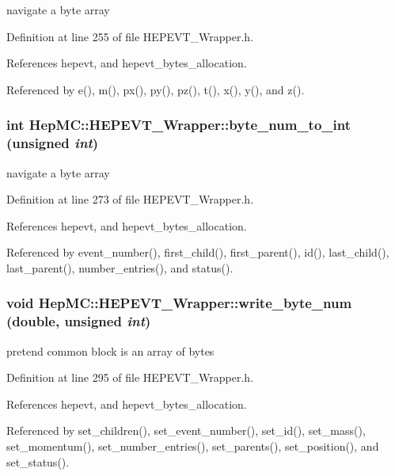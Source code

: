 navigate a byte array 



Definition at line 255 of file HEPEVT\_\-Wrapper.h.

References hepevt, and hepevt\_\-bytes\_\-allocation.

Referenced by e(), m(), px(), py(), pz(), t(), x(), y(), and z().
\subsubsection{\setlength{\rightskip}{0pt plus 5cm}int Hep\-MC::HEPEVT\_\-Wrapper::byte\_\-num\_\-to\_\-int (unsigned {\em int})\hspace{0.3cm}{\tt  [inline, static, protected]}}\label{classHepMC_1_1HEPEVT__Wrapper_a823644bba3e2e3adb4a4b898cc0d811}


navigate a byte array 



Definition at line 273 of file HEPEVT\_\-Wrapper.h.

References hepevt, and hepevt\_\-bytes\_\-allocation.

Referenced by event\_\-number(), first\_\-child(), first\_\-parent(), id(), last\_\-child(), last\_\-parent(), number\_\-entries(), and status().
\subsubsection{\setlength{\rightskip}{0pt plus 5cm}void Hep\-MC::HEPEVT\_\-Wrapper::write\_\-byte\_\-num (double, unsigned {\em int})\hspace{0.3cm}{\tt  [inline, static, protected]}}\label{classHepMC_1_1HEPEVT__Wrapper_c14f6cb970f816f46ba88777914a8023}


pretend common block is an array of bytes 



Definition at line 295 of file HEPEVT\_\-Wrapper.h.

References hepevt, and hepevt\_\-bytes\_\-allocation.

Referenced by set\_\-children(), set\_\-event\_\-number(), set\_\-id(), set\_\-mass(), set\_\-momentum(), set\_\-number\_\-entries(), set\_\-parents(), set\_\-position(), and set\_\-status().

